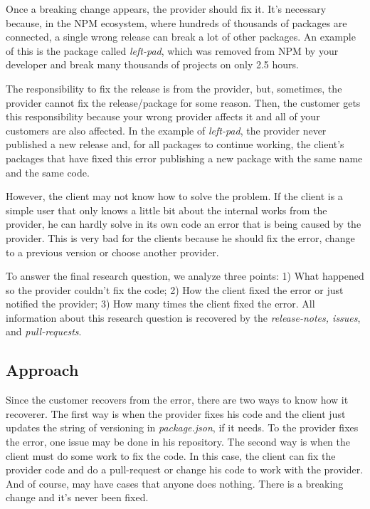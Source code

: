 Once a breaking change appears, the provider should fix it. It’s necessary because, in the \Gls{NPM} ecosystem, where hundreds of thousands of packages are connected, a single wrong release can break a lot of other packages. An example of this is the package called \textit{left-pad}, which was removed from \Gls{NPM} by your developer and break many thousands of projects on only 2.5 hours.

The responsibility to fix the release is from the provider, but, sometimes, the provider cannot fix the release/package for some reason. Then, the customer gets this responsibility because your wrong provider affects it and all of your customers are also affected. In the example of \textit{left-pad}, the provider never published a new release and, for all packages to continue working, the client's packages that have fixed this error publishing a new package with the same name and the same code.

However, the client may not know how to solve the problem. If the client is a simple user that only knows a little bit about the internal works from the provider, he can hardly solve in its own code an error that is being caused by the provider. This is very bad for the clients because he should fix the error, change to a previous version or choose another provider.

To answer the final research question, we analyze three points: 1) What happened so the provider couldn't fix the code; 2) How the client fixed the error or just notified the provider; 3) How many times the client fixed the error. All information about this research question is recovered by the \textit{release-notes, issues}, and \textit{pull-requests}.

\subsection{Approach}
\label{apr:rq3}

Since the customer recovers from the error, there are two ways to know how it recoverer. The first way is when the provider fixes his code and the client just updates the string of versioning in \textit{package.json}, if it needs. To the provider fixes the error, one issue may be done in his repository. The second way is when the client must do some work to fix the code. In this case, the client can fix the provider code and do a pull-request or change his code to work with the provider. And of course, may have cases that anyone does nothing. There is a breaking change and it’s never been fixed.

